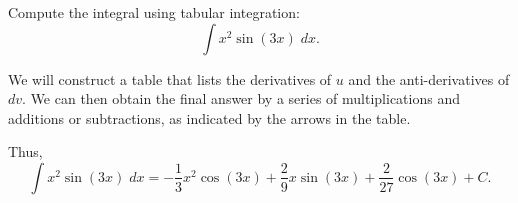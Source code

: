 \documentclass{ximera}
\begin{document}
\begin{example}
Compute the integral using tabular integration:
  \[
  \int x^2\sin(3x) \;dx.
  \]

We will construct a table that lists the derivatives of $u$ and the anti-derivatives of $dv$.
We can then obtain the final answer by a series of multiplications and additions or subtractions, as indicated
by the arrows in the table.


\begin{image}[5cm]
\end{image}

Thus,
\[
  \int x^2\sin(3x) \;dx = -\frac13 x^2\cos(3x) + \frac29x\sin(3x) + \frac{2}{27} \cos(3x) + C.
  \]

\end{example}
\end{document}
